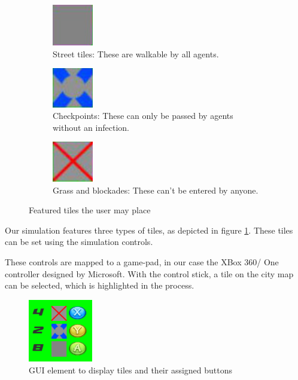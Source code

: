 \documentclass[table]{sig-alternate-05-2015}
\begin{document}
\begin{figure}[h]
\begin{center}
\begin{subfigure}{0.4\textwidth}
\begin{center}
\includegraphics[width = 50pt]{Pictures/tile_street.jpg}
\caption{Street tiles: These are walkable by all agents.}
\end{center}
\end{subfigure}
\begin{subfigure}{0.4\textwidth}
\begin{center}
\includegraphics[width = 50pt]{Pictures/tile_checkpoint.jpg}
\caption{Checkpoints: These can only be passed by agents without an infection.}
\end{center}
\end{subfigure}
\begin{subfigure}{0.4\textwidth}
\begin{center}
\includegraphics[width =50pt]{Pictures/tile_blockade.jpg}
\caption{Grass and blockades: These can't be entered by anyone.}
\end{center}
\end{subfigure}
\caption{Featured tiles the user may place}
\label{fig:tiles}
\end{center}
\end{figure}

Our simulation features three types of tiles, as depicted in figure \ref{fig:tiles}. These tiles can be set using the simulation controls.

These controls are mapped to a game-pad, in our case the XBox 360/ One controller designed by Microsoft. With the control stick, a tile on the city map can be selected, which is highlighted in the process.

\begin{figure}[h]
\begin{center}
\includegraphics[width = 0.25\textwidth]{Pictures/gui_without_avg.png}
\end{center}
\caption{GUI element to display tiles and their assigned buttons}
\label{pic:gui_tiles}
\end{figure}
\end{document}
